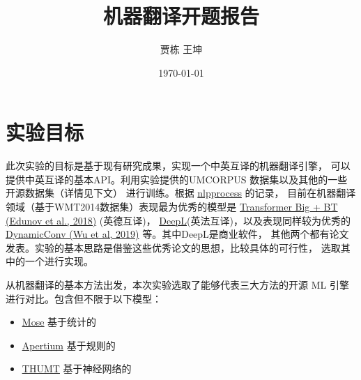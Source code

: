 \documentclass[UTF8,a4paper,10pt]{ctexart}
\title{\textbf{机器翻译开题报告}}
\author{贾栋\; 王坤}
\date{\today}
\begin{document}
    \maketitle


\begingroup %
\color{black}%
\renewcommand{\contentsname}{目录}
\tableofcontents
\newpage
\endgroup   %
 


\section{实验目标}


此次实验的目标是基于现有研究成果，实现一个中英互译的机器翻译引擎，
可以提供中英互译的基本API。利用实验提供的UMCORPUS 数据集以及其他的一些开源数据集（详情见下文）
进行训练。根据 \href{http://nlpprogress.com/english/machine_translation.html}{\color{blue}nlpprocess} 的记录，
目前在机器翻译领域（基于WMT2014数据集）表现最为优秀的模型是 \href{https://arxiv.org/pdf/1808.09381.pdf}{\color{blue}Transformer Big + BT (Edunov et al., 2018)} (英德互译)，
\href{https://www.deepl.com/press.html}{\color{blue}DeepL}(英法互译)，以及表现同样较为优秀的 \href{https://arxiv.org/abs/1901.10430.pdf}{\color{blue}DynamicConv (Wu et al, 2019)}
等。其中DeepL是商业软件，
  其他两个都有论文发表。实验的基本思路是借鉴这些优秀论文的思想，比较具体的可行性，
  选取其中的一个进行实现。

从机器翻译的基本方法出发，本次实验选取了能够代表三大方法的开源 ML 引擎进行对比。包含但不限于以下模型：
\begin{itemize}

\item[$$$\bullet$] \href{http://www.statmt.org/moses/?n=Moses.Overview}{\color{blue}\underline{Mose}}  基于统计的 

\item[$\bullet$] \href{https://github.com/apertium}{\color{blue}\underline{Apertium}}                基于规则的

\item[$\bullet$] \href{http://thumt.thunlp.org/}{\color{blue}\underline{THUMT}}                     基于神经网络的
\end{itemize}
   
\end{document}
